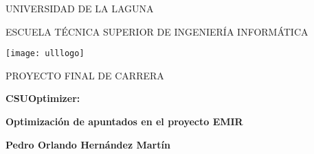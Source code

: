 \begin{titlepage}
\centerline{\Large UNIVERSIDAD DE LA LAGUNA}
\vspace{0.3cm}
\centerline{\large ESCUELA TÉCNICA SUPERIOR DE INGENIERÍA INFORMÁTICA}
\vspace{0.5cm}
\centerline{\texttt{[image: ulllogo]}}
\vspace{0.5cm}
\centerline{\large PROYECTO FINAL DE CARRERA}
\vspace{3cm}

\titlesp
\begin{center}
{\Huge\bf{CSUOptimizer:}}

\vspace{0.3cm}
{\Huge\bf{Optimización de apuntados en el proyecto EMIR}}

\end{center}

\dsp
\vspace{6cm}
\begin{flushright}
\begin{minipage}{8cm}
{\bf Pedro Orlando Hernández Martín}

\vspace{0.3cm}
\end{minipage}
\end{flushright}

\end{titlepage}
